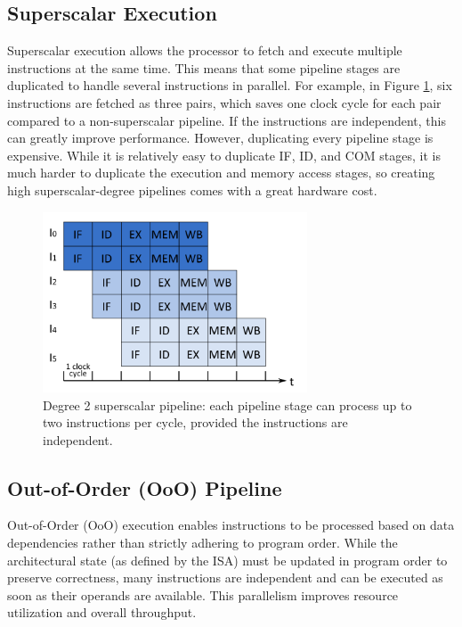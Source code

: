 \subsection{Superscalar Execution}

Superscalar execution allows the processor to fetch and execute multiple instructions at the same time. This means that some pipeline stages are duplicated to handle several instructions in parallel. For example, in Figure \ref{fig:superscalar}, six instructions are fetched as three pairs, which saves one clock cycle for each pair compared to a non-superscalar pipeline. If the instructions are independent, this can greatly improve performance. However, duplicating every pipeline stage is expensive. While it is relatively easy to duplicate IF, ID, and COM stages, it is much harder to duplicate the execution and memory access stages, so creating high superscalar-degree pipelines comes with a great hardware cost.

\begin{figure}[H]
    \centering
    \includegraphics[width=0.7\textwidth]{figures/multiscalar-execution.png}
    \caption{Degree 2 superscalar pipeline: each pipeline stage can process up to two instructions per cycle, provided the instructions are independent.}
    \label{fig:superscalar}
\end{figure}

\subsection{Out-of-Order (OoO) Pipeline}
Out-of-Order (OoO) execution enables instructions to be processed based on data dependencies rather than strictly adhering to program order. While the architectural state (as defined by the ISA) must be updated in program order to preserve correctness, many instructions are independent and can be executed as soon as their operands are available. This parallelism improves resource utilization and overall throughput.

